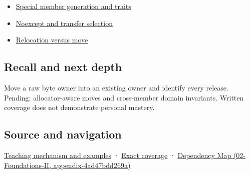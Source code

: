 \begin{itemize}
\tightlist
\item
  \hyperref[appendix-42e02a12c694]{Special member generation and traits}
\item
  \hyperref[appendix-c746afaa47d1]{Noexcept and transfer selection}
\item
  \hyperref[appendix-adfd6397af8d]{Relocation versus move}
\end{itemize}

\subsection{Recall and next depth}\label{appendix-5636651017c2-recall-and-next-depth}

Move a raw byte owner into an existing owner and identify every release. Pending: allocator-aware moves and cross-member domain invariants. Written coverage does not demonstrate personal mastery.

\subsection{Source and navigation}\label{appendix-5636651017c2-source-and-navigation}

\hyperref[01-foundations-i-ch003-a-move-transfers-responsibility-while-the-source-survives]{Teaching mechanism and examples} · \hyperref[appendix-fd090d982a15-m009---parts-127-147]{Exact coverage} · \href{../02-Foundations-II/main.pdf\#nameddest=appendix-4ad47bdd269a}{Dependency Map (02-Foundations-II, appendix-4ad47bdd269a)}
